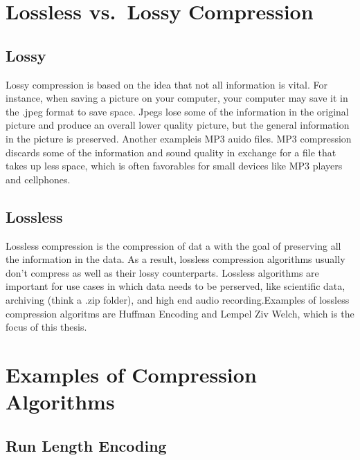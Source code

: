 \documentclass[12pt,twoside]{reedthesis}
\begin{document}
\hypertarget{lossless-vs.-lossy-compression}{%
\section{Lossless vs.~Lossy Compression}\label{lossless-vs.-lossy-compression}}

\hypertarget{lossy}{%
\subsection{Lossy}\label{lossy}}

Lossy compression is based on the idea that not all information is vital. For instance, when saving a picture on your computer, your computer may save it in the .jpeg format to save space. Jpegs lose some of the information in the original picture and produce an overall lower quality picture, but the general information in the picture is preserved. Another exampleis MP3 auido files. MP3 compression discards some of the information and sound quality in exchange for a file that takes up less space, which is often favorables for small devices like MP3 players and cellphones.

\hypertarget{lossless}{%
\subsection{Lossless}\label{lossless}}

Lossless compression is the compression of dat a with the goal of preserving all the information in the data. As a result, lossless compression algorithms usually don't compress as well as their lossy counterparts. Lossless algorithms are important for use cases in which data needs to be perserved, like scientific data, archiving (think a .zip folder), and high end audio recording.Examples of lossless compression algoritms are Huffman Encoding and Lempel Ziv Welch, which is the focus of this thesis.

\hypertarget{examples-of-compression-algorithms}{%
\section{Examples of Compression Algorithms}\label{examples-of-compression-algorithms}}

\hypertarget{run-length-encoding}{%
\subsection{Run Length Encoding}\label{run-length-encoding}}
\end{document}

